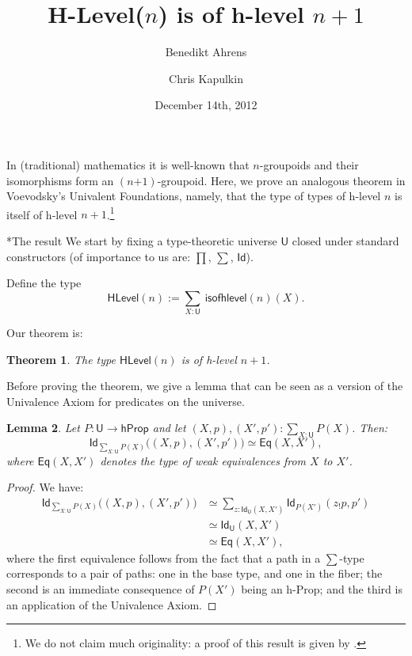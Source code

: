\documentclass[11pt]{scrartcl}
\makeatletter
\theoremstyle{plain}
\newtheorem{theorem}{Theorem}
\newtheorem{lemma}[theorem]{Lemma}
\theoremstyle{definition}
\newcommand{\Eq}{\mathsf{Eq}}
\newcommand{\HLevel}{\mathsf{HLevel}}
\newcommand{\hProp}{\mathsf{hProp}}
\newcommand{\Id}{\mathsf{Id}}
\newcommand{\isofhlevel}{\mathsf{isofhlevel}}
\newcommand{\U}{\mathsf{U}}
\newcommand{\oftype}{\! : \!}
\renewcommand{\paragraph}{\@startsection{paragraph}{4}{0mm}{-0.5\baselineskip}{-1ex}{\bf}}
\makeatother
\begin{document}
\title{H-Level($n$) is of h-level $n + 1$}

\author{Benedikt Ahrens \and Chris Kapulkin}


\date{December 14th, 2012}
\maketitle

In (traditional) mathematics it is well-known that $n$-groupoids and their isomorphisms form an $(n\mbox{+}1)$-groupoid. 
Here, we prove an analogous theorem in Voevodsky's Univalent Foundations, namely, 
that the type of types of h-level $n$ is itself of h-level $n+1$.\footnote{We do not claim much originality: 
a proof of this result is given by \textcite[Section~8.7]{warren-pelayo:univalent-foundations-paper}.}

\paragraph*{The result} We start by fixing a type-theoretic universe $\U$ closed under standard constructors 
(of importance to us are: $\prod$, $\sum$, $\Id$).

Define the type
 \[\HLevel(n) := \sum_{X : \U} \ \isofhlevel(n)(X). \]

Our theorem is:

\begin{theorem}\label{main_thm}
 The type $\HLevel(n)$ is of h-level $n+1$.
\end{theorem}

Before proving the theorem, we give a lemma that can be seen as a version of the Univalence Axiom for predicates on the universe.

\begin{lemma}\label{Id_of_Sigma}
 Let $P \colon \U \to \hProp$ and let $(X, p), (X', p') \oftype \sum\limits_{X : \U} P(X)$. Then:
 \[ \Id_{\sum\limits_{X : \U}P(X)} \big( (X, p), (X', p') \big) \simeq \Eq (X, X'),\]
 where $\Eq (X, X')$ denotes the type of weak equivalences from $X$ to $X'$.
\end{lemma}

\begin{proof}
 We have:
 \begin{equation*}\begin{split}
 \Id_{\sum\limits_{X : \U} P(X)} \big( (X, p), (X', p')\big) & \simeq \sum_{z : \Id_{\U} (X, X')} \Id_{P(X')} (z_!p, p') \\
  & \simeq \Id_{\U} (X, X') \\
  & \simeq \Eq (X, X'),
 \end{split}
 \end{equation*}
 where the first equivalence follows from the fact that a path in a $\sum$-type corresponds to a pair of paths: one in the base type, and one in the fiber; the second is an immediate consequence of $P(X')$ being an h-Prop; and the third is an application of the Univalence Axiom.
\end{proof}
\end{document}
